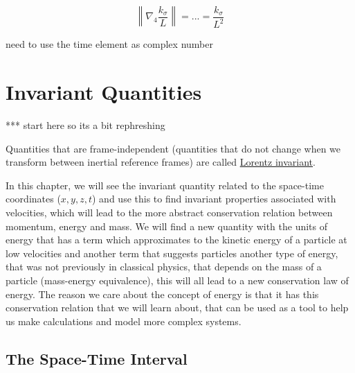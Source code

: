 \begin{equation}
	\left \| \nabla_4 \frac{k_\sigma }{L} \right\| = ... = \frac{k_\sigma}{L^2}
\end{equation}

need to use the time element as complex number




\printbibliography[segment=\therefsegment, heading=subbibliography]

\chapter{Invariant Quantities} \label{ch: Invariant Quantities}

*** start here so its a bit rephreshing

Quantities that are frame-independent (quantities that do not change when we transform between inertial reference frames) are called \hyperlink{def-lorentz-invariant}{Lorentz invariant}.

In this chapter, we will see the invariant quantity related to the space-time coordinates ($x,y,z,t$) and use this to find invariant properties associated with velocities, which will lead to the more abstract conservation relation between momentum, energy and mass.
We will find a new quantity with the units of energy that has a term which approximates to the kinetic energy of a particle at low velocities and another term that suggests particles another type of energy, that was not previously in classical physics, that depends on the mass of a particle (mass-energy equivalence), this will all lead to a new conservation law of energy.
The reason we care about the concept of energy is that it has this conservation relation that we will learn about, that can be used as a tool to help us make calculations and model more complex systems.

\section{The Space-Time Interval} \label{sect: Space-Time Interval}

